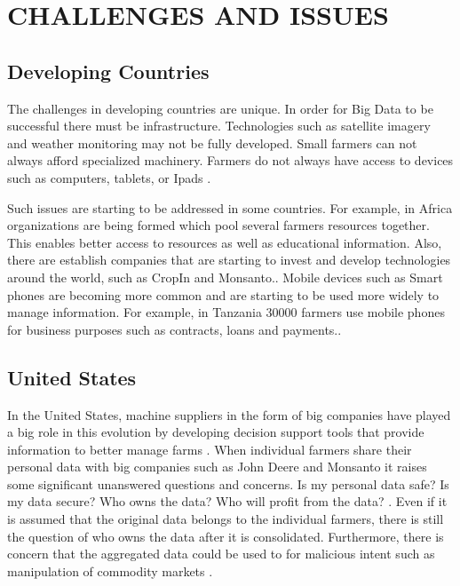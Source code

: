 \documentclass[sigconf]{acmart}
\begin{document}
\section{CHALLENGES AND ISSUES}

\subsection{Developing Countries}

The challenges in developing countries are unique.  In order for Big Data to be successful there must be infrastructure.  Technologies such as satellite imagery and weather monitoring may not be fully developed.  Small farmers can not always afford specialized machinery.  Farmers do not always have access to devices such as computers, tablets, or Ipads \cite{DevEcon}. 

Such issues are starting to be addressed in some countries. For example, in Africa organizations are being formed which pool several farmers resources together. This  enables better access to resources as well as educational information.  Also, there are establish companies that are starting to invest and develop technologies around the world, such as CropIn and Monsanto.\cite {DevEcon}.  Mobile devices such as Smart phones are becoming more common and are starting to be used more widely to manage information. For example, in Tanzania 30000 farmers use mobile phones for business purposes such as contracts, loans and payments.\cite{www-google-Wikipedia}.

\subsection {United States}

In the United States, machine suppliers in the form of big companies have played a big role in this evolution by developing decision support tools that provide information to better manage farms \cite{www-google-Crop}.  When individual farmers share their personal data with big companies such as John Deere and Monsanto it raises some significant unanswered questions and concerns. Is my personal data safe? Is my data secure? Who owns the data? Who will profit from the data? \cite{www-google-Farm}.  Even if  it is assumed that the original data belongs to the individual farmers, there is still the question of who owns the data after it is consolidated. Furthermore, there is concern that the aggregated data could be used to for malicious intent such as manipulation of commodity markets \cite{Wolfert}. 
\end{document}
